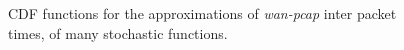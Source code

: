 \begin{figure}[ht!]
{	}
	\hspace{0mm}
	\caption{CDF functions for the approximations of \textit{wan-pcap} inter  packet times, of many stochastic functions.}
\end{figure}


\clearpage

